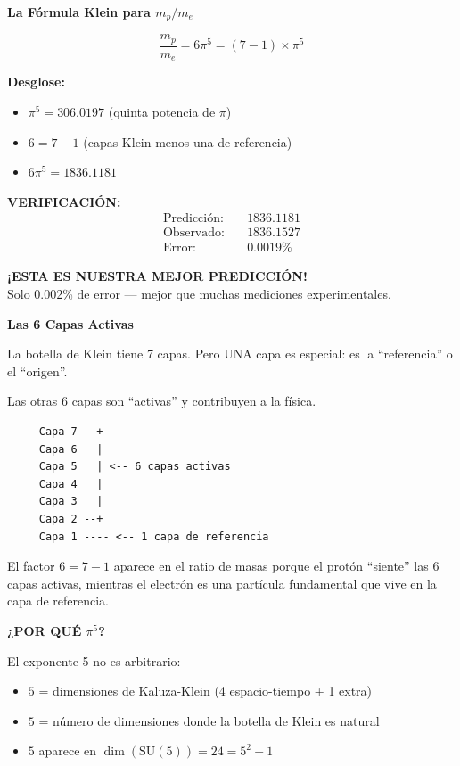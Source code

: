 \begin{nivelmatematico}
\textbf{La Fórmula Klein para $m_p/m_e$}

\begin{equation}
\boxed{\frac{m_p}{m_e} = 6\pi^5 = (7-1) \times \pi^5}
\end{equation}

\textbf{Desglose:}
\begin{itemize}
    \item $\pi^5 = 306.0197$ (quinta potencia de $\pi$)
    \item $6 = 7 - 1$ (capas Klein menos una de referencia)
    \item $6\pi^5 = 1836.1181$
\end{itemize}

\textbf{VERIFICACIÓN:}
\begin{align}
\text{Predicción:} & \quad 1836.1181\\
\text{Observado:} & \quad 1836.1527\\
\text{Error:} & \quad 0.0019\%
\end{align}

\textbf{¡ESTA ES NUESTRA MEJOR PREDICCIÓN!}\\
Solo 0.002\% de error --- mejor que muchas mediciones experimentales.
\end{nivelmatematico}

\begin{analogiabox}
\textbf{Las 6 Capas Activas}

La botella de Klein tiene 7 capas.
Pero UNA capa es especial: es la ``referencia'' o el ``origen''.

Las otras 6 capas son ``activas'' y contribuyen a la física.

\begin{verbatim}
     Capa 7 --+
     Capa 6   |
     Capa 5   | <-- 6 capas activas
     Capa 4   |
     Capa 3   |
     Capa 2 --+
     Capa 1 ---- <-- 1 capa de referencia
\end{verbatim}

El factor $6 = 7-1$ aparece en el ratio de masas porque
el protón ``siente'' las 6 capas activas, mientras el electrón
es una partícula fundamental que vive en la capa de referencia.
\end{analogiabox}

\textbf{¿POR QUÉ $\pi^5$?}

El exponente 5 no es arbitrario:
\begin{itemize}
    \item $5$ = dimensiones de Kaluza-Klein (4 espacio-tiempo + 1 extra)
    \item $5$ = número de dimensiones donde la botella de Klein es natural
    \item $5$ aparece en $\dim(\text{SU}(5)) = 24 = 5^2 - 1$
\end{itemize}

